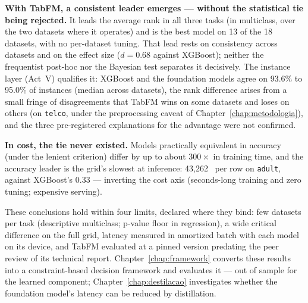 \textbf{With TabFM, a consistent leader emerges --- without the
statistical tie being rejected.} It leads the average rank in all
three tasks (in multiclass, over the two datasets where it operates) and
is the best model on 13 of the 18 datasets, with no per-dataset
tuning. That lead rests on consistency across datasets and on the
effect size ($d{=}0.68$ against XGBoost); neither the frequentist
post-hoc nor the Bayesian test separates it decisively. The
instance layer (Act~V) qualifies it: XGBoost and the foundation
models agree on 93.6\% to 95.0\% of instances (median across
datasets), the rank difference arises from a small fringe of
disagreements that TabFM wins on some datasets and loses on others
(on \texttt{telco}, under the preprocessing caveat of
Chapter~\ref{chap:metodologia}),
and the three pre-registered explanations for the advantage were
not confirmed.

\textbf{In cost, the tie never existed.} Models practically
equivalent in accuracy (under the lenient criterion) differ by up to
about $300\times$ in training time, and the accuracy leader is the
grid's slowest at inference: 43{,}262~\us{} per row on
\texttt{adult}, against XGBoost's 0.33 --- inverting the cost axis
(seconds-long training and zero tuning; expensive serving).

These conclusions hold within four limits, declared where they bind:
few datasets per task (descriptive multiclass; p-value floor in
regression), a wide critical difference on the full grid, latency
measured in amortized batch with each model on its device, and TabFM
evaluated at a pinned version predating the peer review of its
technical report. Chapter~\ref{chap:framework} converts these
results into a constraint-based decision framework and evaluates it
--- out of sample for the learned component;
Chapter~\ref{chap:destilacao} investigates whether the foundation
model's latency can be reduced by distillation.
